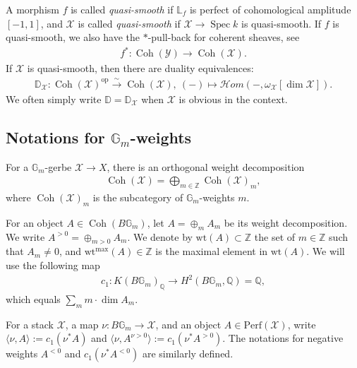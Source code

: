 \documentclass [11pt,oneside,a4paper,mathscr]{amsart}
\theoremstyle{definition}
\newcommand{\Y}{\mathcal{Y}}
\newcommand{\X}{\mathcal{X}}
\newcommand{\bgm}{B\mathbb{G}_m}
\newcommand{\Coh}{\operatorname{Coh}}
\newcommand{\Spec}{\operatorname{Spec}}
\newcommand{\wt}{\mathrm{wt}}
\begin{document}
A morphism $f$ is called \textit{quasi-smooth} 
if $\mathbb{L}_f$ is perfect of cohomological amplitude $[-1, 1]$, and $\X$ is called 
\textit{quasi-smooth} if $\X \to \Spec k$ is quasi-smooth. 
If $f$ is quasi-smooth, we also have the $*$-pull-back for coherent sheaves, 
see~\cite[Section~4.2]{PoSa}
\begin{align*}
    f^* \colon \Coh(\Y) \to \Coh(\X).
\end{align*}
If $\mathcal{X}$ is quasi-smooth, then 
there are duality equivalences: 
\begin{align*}%
\mathbb{D}_{\mathcal{X}} \colon \Coh(\mathcal{X})^{\mathrm{op}} \stackrel{\sim}{\to}
\Coh(\mathcal{X}), \ (-)\mapsto \mathcal{H}om(-, \omega_{\mathcal{X}}[\dim \mathcal{X}]).
\end{align*}
We often simply write $\mathbb{D}=\mathbb{D}_{\mathcal{X}}$ when $\mathcal{X}$ is 
obvious in the context. 






\subsection{\texorpdfstring{Notations for $\mathbb{G}_m$-weights}{Notation on Gm-weights}}\label{subsec:Gmwt}
For a $\mathbb{G}_m$-gerbe $\X \to X$, there is an orthogonal weight 
decomposition 
\begin{align*}
    \Coh(\X)=\bigoplus_{m\in \mathbb{Z}}\Coh(\X)_m,
\end{align*}
where $\Coh(\X)_m$ is the subcategory of $\mathbb{G}_m$-weights $m$. 

For an object $A \in \Coh(\bgm)$,
let $A=\oplus_m A_m$ 
be its weight decomposition. We write $A^{>0}=\oplus_{m>0} A_m$. 
We denote by $\wt(A)\subset \mathbb{Z}$ the set of $m\in \mathbb{Z}$ such that $A_m\neq 0$, 
and $\wt^{\mathrm{max}}(A)\in \mathbb{Z}$ is the maximal element in $\wt(A)$. 
We will use the following map 
\begin{align*}
c_1 \colon K(\bgm)_{\mathbb{Q}} \to H^2(\bgm, \mathbb{Q})=\mathbb{Q}, 
\end{align*}
which equals $\sum_m m \cdot \dim A_m$. 

For a stack $\mathcal{X}$, a map $\nu \colon \bgm \to \mathcal{X}$, and an object
$A \in \mathrm{Perf}(\mathcal{X})$, write 
$\langle \nu, A \rangle:=c_1 (\nu^{\ast}A)$ and 
$\langle \nu, A^{\nu>0}\rangle :=c_1 (\nu^{\ast}A^{>0})$. 
The notations for negative weights $A^{<0}$ and $c_1(\nu^* A^{<0})$ are similarly defined. 
\end{document}
